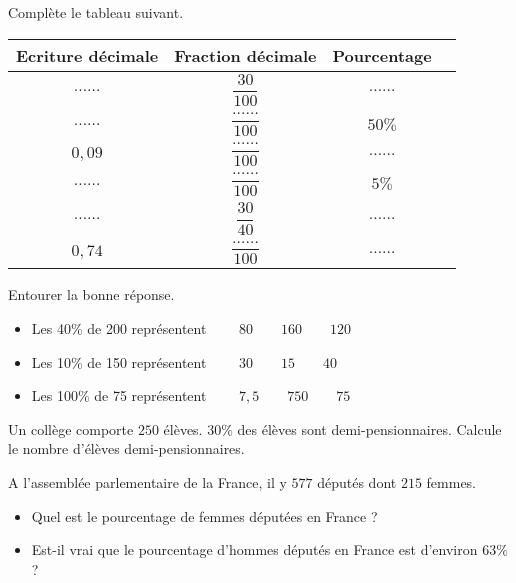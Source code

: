 \begin{pageParcoursu} 

 

Complète le tableau suivant.

 \begin{tabular}{|c|c|c|c|}
  \hline 
  Ecriture décimale & Fraction décimale & Pourcentage \\ 
  \hline 
  $\ldots\ldots$  & $\dfrac{30}{100}$  &  $\ldots\ldots$  \\ 
  \hline 
  $\ldots\ldots$  & $\dfrac{\ldots\ldots}{100}$    & $50\%$  \\ 
  \hline 
 $0,09$  & $\dfrac{\ldots\ldots}{100}$   & $\ldots\ldots$   \\ 
  \hline 
$\ldots\ldots$    & $\dfrac{\ldots\ldots}{100}$   &  $5\%$   \\ 
  \hline 
$\ldots\ldots$    & $\dfrac{30}{40}$   &  $\ldots\ldots$   \\ 
  \hline 
 $0,74$   &  $\dfrac{\ldots\ldots}{100}$  &  $\ldots\ldots$   \\ 
  \hline
  \end{tabular}  



Entourer la bonne réponse.
\begin{itemize}[leftmargin=*]
\item Les 40\% de 200 représentent	$\quad \quad 80	\quad\quad 160\quad\quad	120$ \vspace{0.1cm}
\item Les 10\% de 150 représentent	$\quad\quad 30	\quad\quad 15	\quad\quad40$\vspace{0.1cm}
\item Les 100\% de 75 représentent	$\quad\quad 7,5 \quad\quad 750	\quad\quad 75$\vspace{0.1cm}
\end{itemize}



Un collège comporte $250$ élèves. $30\%$ des élèves sont demi-pensionnaires. Calcule le nombre d'élèves demi-pensionnaires. 
 

 
 
 A l'assemblée parlementaire de la France, il y $577$ députés dont $215$ femmes.
 
\begin{itemize}[leftmargin=*]
\item Quel est le pourcentage de femmes députées en France ?
\item Est-il vrai que le pourcentage d'hommes députés en France est d'environ $63\%$ ?
\end{itemize}

\end{pageParcoursu}
